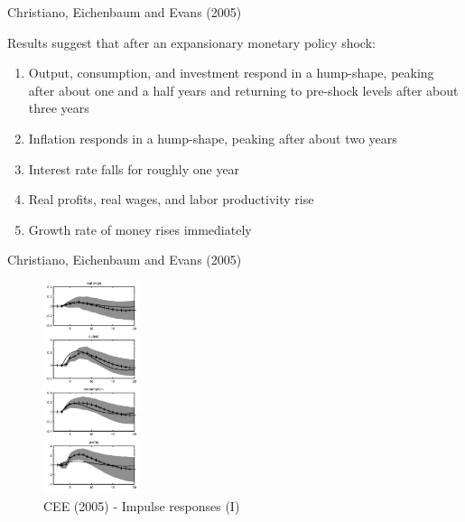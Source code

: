 
\begin{frame}{Christiano, Eichenbaum and Evans (2005)}

Results suggest that after an expansionary monetary policy shock:
\begin{enumerate}
\item 	Output, consumption, and investment respond in a hump-shape, peaking after about one and a half years and returning to pre-shock levels after about three years
\item 	Inflation responds in a hump-shape, peaking after about two years
\item 	Interest rate falls for roughly one year
\item 	Real profits, real wages, and labor productivity rise
\item 	Growth rate of money rises immediately
\end{enumerate}

\end{frame}


\begin{frame}{Christiano, Eichenbaum and Evans (2005)}

\begin{figure}
\caption[CEE - Subset 1]{CEE (2005) - Impulse responses (I)}
\centering
\label{fig:cee_responses}
\includegraphics[width=0.25\textwidth]{Figures/cee_responses.JPG}
\end{figure}

\end{frame}

